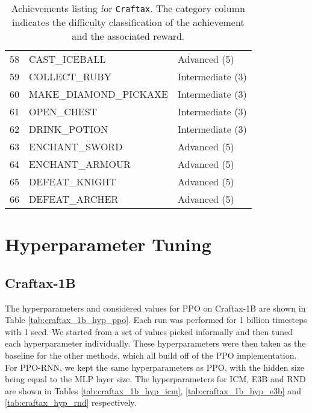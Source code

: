 \documentclass{article}
\theoremstyle{plain}
\theoremstyle{definition}
\theoremstyle{remark}
\begin{document}
\begin{table*}[t]
\begin{tabular}{@{}l l l@{}}
    58 & CAST\_ICEBALL & Advanced (5)\\
    59 & COLLECT\_RUBY & Intermediate (3)\\
    60 & MAKE\_DIAMOND\_PICKAXE & Intermediate (3)\\
    61 & OPEN\_CHEST & Intermediate (3)\\
    62 & DRINK\_POTION & Intermediate (3)\\
    63 & ENCHANT\_SWORD & Advanced (5)\\
    64 & ENCHANT\_ARMOUR & Advanced (5)\\
    65 & DEFEAT\_KNIGHT & Advanced (5)\\
    66 & DEFEAT\_ARCHER & Advanced (5)\\
    \bottomrule
\end{tabular}
\caption{Achievements listing for \texttt{Craftax}.  The category column indicates the difficulty classification of the achievement and the associated reward.}
\label{tab:achievements_listing}
\end{table*}

\section{Hyperparameter Tuning} \label{app:hyp}

\subsection{Craftax-1B}
The hyperparameters and considered values for PPO on Craftax-1B are shown in Table \ref{tab:craftax_1b_hyp_ppo}.  Each run was performed for 1 billion timesteps with 1 seed.  We started from a set of values picked informally and then tuned each hyperparameter individually.  These hyperparameters were then taken as the baseline for the other methods, which all build off of the PPO implementation.  For PPO-RNN, we kept the same hyperparameters as PPO, with the hidden size being equal to the MLP layer size.  The hyperparameters for ICM, E3B and RND are shown in Tables \ref{tab:craftax_1b_hyp_icm}, \ref{tab:craftax_1b_hyp_e3b} and \ref{tab:craftax_hyp_rnd} respectively.
\end{document}
